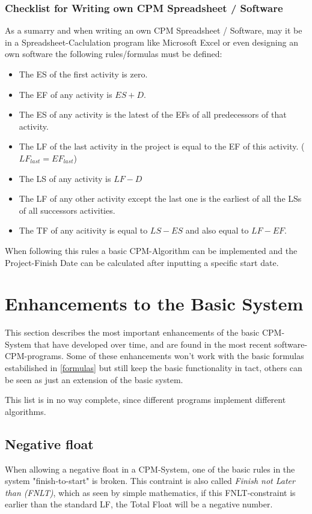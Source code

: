 \subsubsection{Checklist for Writing own CPM Spreadsheet / Software}
As a sumarry and when writing an own CPM Spreadsheet / Software, may it be in a Spreadsheet-Caclulation program like Microsoft Excel or even designing an own software the following rules/formulas must be defined:
\begin{itemize}
	\item The ES of the first activity is zero.
	\item The EF of any activity is $ES + D$.
	\item The ES of any activity is the latest of the EFs of all predecessors of that activity.
	\item The LF of the last activity in the project is equal to the EF of this activity. ($LF_{last} = EF_{last}$)
	\item The LS of any activity is $LF - D$
	\item The LF of any other activity except the last one is the earliest of all the LSs of all successors activities.
	\item The TF of any acitivity is equal to $LS - ES$ and also equal to $LF - EF$.
\end{itemize}
When following this rules a basic CPM-Algorithm can be implemented and the Project-Finish Date can be calculated after inputting a specific start date.













\section{Enhancements to the Basic System}
This section describes the most important enhancements of the basic CPM-System that have developed over time, and are found in the most recent software-CPM-programs. Some of these enhancements won't work with the basic formulas estabilished in \ref{formulas} but still keep the basic functionality in tact, others can be seen as just an extension of the basic system.

This list is in no way complete, since different programs implement different algorithms.

\subsection{Negative float}
When allowing a negative float in a CPM-System, one of the basic rules in the system "finish-to-start" is broken. This contraint is also called \textit{Finish not Later than (FNLT)}, which as seen by simple mathematics, if this FNLT-constraint is earlier than the standard LF, the Total Float will be a negative number.

